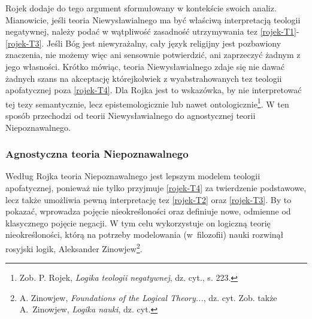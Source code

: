 Rojek dodaje do tego argument sformułowany w kontekście
swoich analiz. Mianowicie, jeśli teoria Niewysławialnego ma być
właściwą interpretacją teologii negatywnej, należy podać w wątpliwość
zasadność utrzymywania tez \eqref{rojek-T1}-\eqref{rojek-T3}. Jeśli Bóg jest
niewyrażalny, cały język religijny jest pozbawiony znaczenia, nie
możemy więc ani sensownie potwierdzić, ani zaprzeczyć żadnym z jego
własności. Krótko mówiąc, teoria Niewysławialnego zdaje się nie dawać żadnych szans na
akceptację którejkolwiek z wyabstrahowanych tez teologii apofatycznej poza \eqref{rojek-T4}.
Dla Rojka jest to wskazówka, by nie interpretować tej tezy
semantycznie, lecz epistemologicznie lub nawet
ontologicznie\footnote{Zob. P. Rojek, \textit{Logika teologii negatywnej}, dz. cyt., s. 223.}. W ten sposób przechodzi od
teorii Niewysławialnego do agnostycznej teorii Niepoznawalnego.


\subsubsection{Agnostyczna teoria Niepoznawalnego}

Według Rojka teoria Niepoznawalnego jest lepszym modelem teologii apofatycznej,
ponieważ nie tylko przyjmuje \eqref{rojek-T4} za twierdzenie podstawowe, lecz także
umożliwia pewną interpretację tez \eqref{rojek-T2} oraz \eqref{rojek-T3}. By to pokazać,
wprowadza pojęcie nieokreśloności oraz definiuje nowe, odmienne od
klasycznego pojęcie negacji. W tym celu wykorzystuje on logiczną teorię
nieokreśloności, którą na potrzeby modelowania (w~filozofii) nauki rozwinął
rosyjski logik, Aleksander Zinowjew\footnote{A. Zinowjew, \textit{Foundations
of the Logical Theory...}, dz. cyt. Zob. także A.~Zinowjew,
\textit{Logika nauki}, dz. cyt. }.

